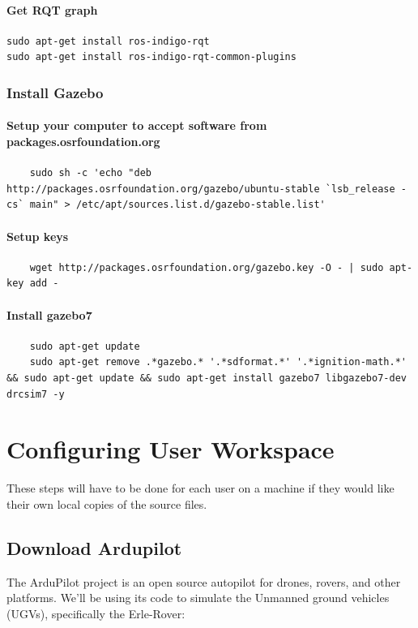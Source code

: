\documentclass{report}
\begin{document}
\subsubsection{Get RQT graph}
\begin{lstlisting}
sudo apt-get install ros-indigo-rqt
sudo apt-get install ros-indigo-rqt-common-plugins
\end{lstlisting}


\subsection{Install Gazebo}
\subsubsection{Setup your computer to accept software from packages.osrfoundation.org}
\begin{lstlisting}
	sudo sh -c 'echo "deb http://packages.osrfoundation.org/gazebo/ubuntu-stable `lsb_release -cs` main" > /etc/apt/sources.list.d/gazebo-stable.list'
\end{lstlisting}

\subsubsection{Setup keys}
\begin{lstlisting}
	wget http://packages.osrfoundation.org/gazebo.key -O - | sudo apt-key add -
\end{lstlisting}

\subsubsection{Install gazebo7}
\begin{lstlisting}
	sudo apt-get update
	sudo apt-get remove .*gazebo.* '.*sdformat.*' '.*ignition-math.*' && sudo apt-get update && sudo apt-get install gazebo7 libgazebo7-dev drcsim7 -y
\end{lstlisting}


\chapter{Configuring User Workspace}
These steps will have to be done for each user on a machine if they would like their own local copies of the source files.

\section{Download Ardupilot}
The ArduPilot project is an open source autopilot for drones, rovers, and other platforms. We'll be using its code to simulate the Unmanned ground vehicles (UGVs), specifically the Erle-Rover:
\end{document}
